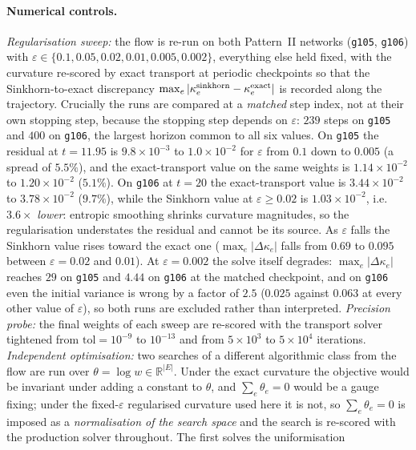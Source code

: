 \documentclass[11pt]{article}
\begin{document}
\paragraph{Numerical controls.}
\emph{Regularisation sweep:} the flow is re-run on both Pattern~II networks
(\texttt{g105}, \texttt{g106}) with
$\varepsilon\in\{0.1,0.05,0.02,0.01,0.005,0.002\}$, everything else held
fixed, with the curvature re-scored by exact transport at periodic checkpoints
so that the {Sinkhorn}-to-exact discrepancy
$\max_e|\kappa_e^{\rm sinkhorn}-\kappa_e^{\rm exact}|$ is recorded along the
trajectory. Crucially the runs are compared at a \emph{matched} step index, not
at their own stopping step, because the stopping step depends on
$\varepsilon$: $239$ steps on \texttt{g105} and $400$ on \texttt{g106}, the
largest horizon common to all six values. On \texttt{g105} the residual at
$t=11.95$ is $9.8\times10^{-3}$ to $1.0\times10^{-2}$ for
$\varepsilon$ from $0.1$ down to $0.005$ (a spread of $5.5\%$), and the
exact-transport value on the same weights is $1.14\times10^{-2}$ to
$1.20\times10^{-2}$ ($5.1\%$). On \texttt{g106} at $t=20$ the exact-transport
value is $3.44\times10^{-2}$ to $3.78\times10^{-2}$ ($9.7\%$), while the
{Sinkhorn} value at $\varepsilon\ge0.02$ is $1.03\times10^{-2}$, i.e.
$3.6\times$ \emph{lower}: entropic smoothing shrinks curvature magnitudes, so
the regularisation understates the residual and cannot be its source. As
$\varepsilon$ falls the {Sinkhorn} value rises toward the exact one
($\max_e|\Delta\kappa_e|$ falls from $0.69$ to $0.095$ between
$\varepsilon=0.02$ and $0.01$). At $\varepsilon=0.002$ the solve itself
degrades: $\max_e|\Delta\kappa_e|$ reaches $29$ on \texttt{g105} and $4.44$
on \texttt{g106} at the matched checkpoint, and on \texttt{g106} even the
initial variance is wrong by a factor of $2.5$ ($0.025$ against $0.063$ at every
other value of $\varepsilon$), so both runs are excluded rather than
interpreted.
\emph{Precision probe:} the final weights of each sweep are re-scored with the
transport solver tightened from $\text{tol}=10^{-9}$ to $10^{-13}$ and from
$5\times10^3$ to $5\times10^4$ iterations.
\emph{Independent optimisation:} two searches of a different algorithmic class
from the flow are run over $\theta = \log w \in \mathbb{R}^{|E|}$. Under the
exact curvature the objective would be invariant under adding a constant to
$\theta$, and $\sum_e\theta_e=0$ would be a gauge fixing; under the
fixed-$\varepsilon$ regularised curvature used here it is not, so
$\sum_e\theta_e=0$ is imposed as a \emph{normalisation of the search space}
and the search is re-scored with the production solver throughout. The first solves the uniformisation
\end{document}
